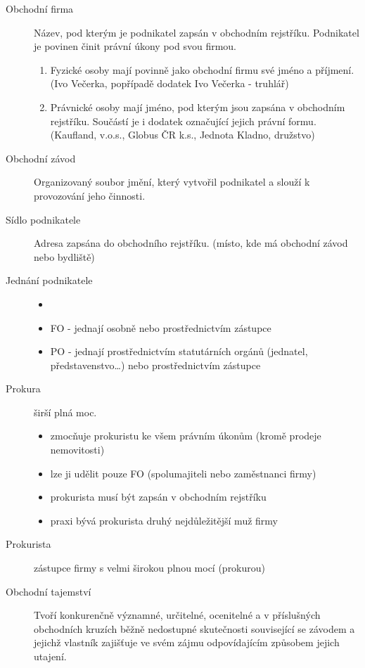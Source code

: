     \begin{description}
        \item[Obchodní firma] Název, pod kterým je podnikatel zapsán v obchodním rejstříku. Podnikatel je povinen činit právní úkony pod svou firmou.
            \begin{enumerate}
                \item Fyzické osoby mají povinně jako obchodní firmu své jméno a příjmení. (Ivo Večerka, popřípadě dodatek Ivo Večerka - truhlář)
                \item Právnické osoby mají jméno, pod kterým jsou zapsána v obchodním rejstříku. Součástí je i dodatek označující jejich právní formu. (Kaufland, v.o.s., Globus ČR k.s., Jednota Kladno, družstvo)
            \end{enumerate}
        \item[Obchodní závod] Organizovaný soubor jmění, který vytvořil podnikatel a slouží k provozování jeho činnosti.
        \item[Sídlo podnikatele] Adresa zapsána do obchodního rejstříku. (místo, kde má obchodní závod nebo bydliště)
        \item[Jednání podnikatele]
            \begin{itemize}
                \item []
                \item FO - jednají osobně nebo prostřednictvím zástupce
                \item PO - jednají prostřednictvím statutárních orgánů (jednatel, představenstvo\ldots) nebo prostřednictvím zástupce
            \end{itemize}
        \item[Prokura] širší plná moc.
            \begin{itemize}
                \item zmocňuje prokuristu ke všem právním úkonům (kromě prodeje nemovitosti)
                \item lze ji udělit pouze FO (spolumajiteli nebo zaměstnanci firmy)
                \item prokurista musí být zapsán v obchodním rejstříku
                \item praxi bývá prokurista druhý nejdůležitější muž firmy
            \end{itemize}
        \item[Prokurista] zástupce firmy s velmi širokou plnou mocí (prokurou)
        \item[Obchodní tajemství] Tvoří konkurenčně významné, určitelné, ocenitelné a v příslušných obchodních kruzích běžně nedostupné skutečnosti související se závodem a jejichž vlastník zajišťuje ve svém zájmu odpovídajícím způsobem jejich utajení.

\end{description}
